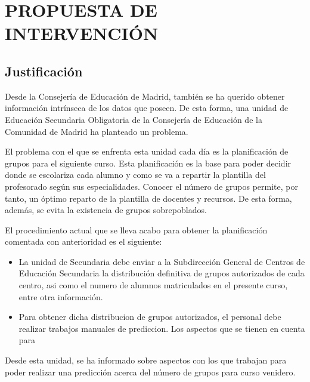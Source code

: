 \section{PROPUESTA DE INTERVENCIÓN}
\subsection{Justificación}
Desde la Consejería de Educación de Madrid, también se ha querido obtener información intrínseca de los datos que poseen. De esta forma, una unidad de Educación Secundaria Obligatoria de la Consejería de Educación de la Comunidad de Madrid ha planteado un problema.

El problema con el que se enfrenta esta unidad cada día es la planificación de grupos para el siguiente curso. Esta planificación es la base para poder decidir donde se escolariza cada alumno y como se va a repartir la plantilla del profesorado según sus especialidades. Conocer el número de grupos permite, por tanto, un óptimo reparto de la plantilla de docentes y recursos. De esta forma, además, se evita la existencia de grupos sobrepoblados.

El procedimiento actual que se lleva acabo para obtener la planificación comentada con anterioridad es el siguiente:
\begin{itemize}
	\item La unidad de Secundaria debe enviar a la Subdirección General de Centros de Educación Secundaria la distribución definitiva de grupos autorizados de cada centro, asi como el numero de alumnos matriculados en el presente curso, entre otra información.
	\item Para obtener dicha distribucion de grupos autorizados, el personal debe realizar trabajos manuales de prediccion. Los aspectos que se tienen en cuenta para 
\end{itemize}


Desde esta unidad, se ha informado sobre aspectos con los que trabajan para poder realizar una predicción acerca del número de grupos para curso venidero. 

